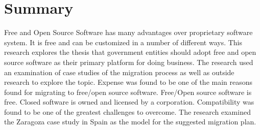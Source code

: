 \documentclass[a4paper, 12pt]{book}
\begin{document}
\chapter*{Summary}
\label{chap:summary}
	Free and Open Source Software has many advantages over proprietary software system. It is free and can be customized in a number of different ways. This research explores the thesis that government entities should adopt free and open source software as their primary platform for doing business. The research used an examination of case studies of the migration process as well as outside research to explore the topic. Expense was found to be one of the main reasons found for migrating to free/open source software. Free/Open source software is free. Closed software is owned and licensed by a corporation. Compatibility was found to be one of the greatest challenges to overcome. 
	The research examined the Zaragoza  case study in Spain as the model for the suggested migration plan. 




 


\appendix

\nocite{*}


\label{Bibliography}

\end{document}
